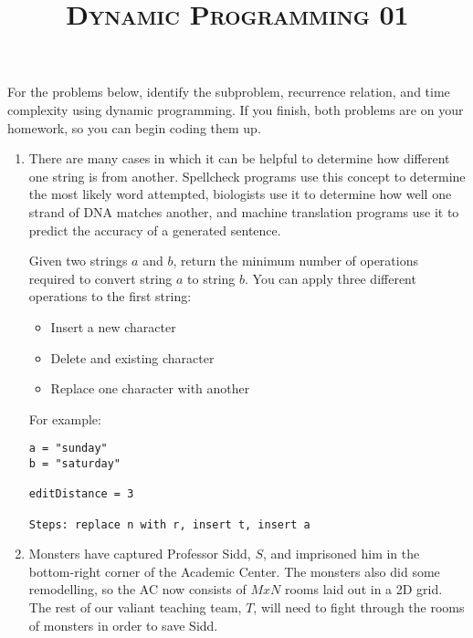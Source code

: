 \documentclass{article}
\title{\large{\textsc{Dynamic Programming 01}}}
\date{}
\begin{document}
\maketitle

\subsection*{}


For the problems below, identify the subproblem, recurrence relation, and time complexity using dynamic programming. If you finish, both problems are on your homework, so you can begin coding them up.


\begin{enumerate}

\item There are many cases in which it can be helpful to determine how different one string is from another.  Spellcheck programs use this concept to determine the most likely word attempted, biologists use it to determine how well one strand of DNA matches another, and machine translation programs use it to predict the accuracy of a generated sentence. 

Given two strings $a$ and $b$, return the minimum number of operations required to convert string $a$ to string $b$. You can apply three different operations to the first string:

\begin{itemize}
    \item Insert a new character
    \item Delete and existing character
    \item Replace one character with another
\end{itemize}

For example: 

\begin{lstlisting}
a = "sunday"
b = "saturday"

editDistance = 3

Steps: replace n with r, insert t, insert a 
\end{lstlisting}

\item Monsters have captured Professor Sidd, $S$, and imprisoned him in the bottom-right corner of the Academic Center.  The monsters also did some remodelling, so the AC now consists of $M x N$ rooms laid out in a 2D grid.  The rest of our valiant teaching team, $T$, will need to fight through the rooms of monsters in order to save Sidd.  


\end{enumerate}
\end{document}
